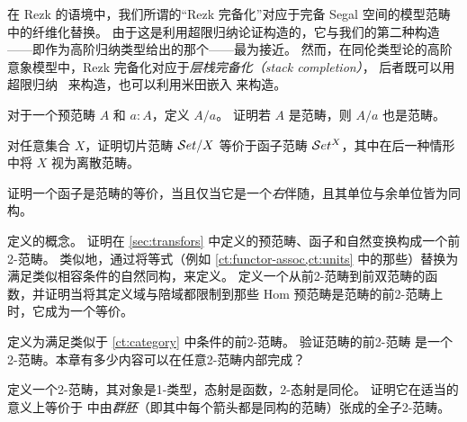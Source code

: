 在 Rezk 的语境中，我们所谓的``Rezk 完备化''对应于完备 Segal 空间的模型范畴中的纤维化替换。
由于这是利用超限归纳论证构造的，它与我们的第二种构造——即作为高阶归纳类型给出的那个——最为接近。
然而，在同伦类型论的高阶意象模型中，Rezk 完备化对应于\emph{层栈完备化（stack completion）}，
后者既可以用超限归纳~\cite{jt:strong-stacks} 来构造，也可以利用米田嵌入 \cite{bunge:stacks-morita-internal} 来构造。

\sectionExercises

\begin{ex}\label{ex:slice-precategory}
  对于一个预范畴 $A$ 和 $a:A$，定义 $A/a$。
  证明若 $A$ 是范畴，则 $A/a$ 也是范畴。
\end{ex}

\begin{ex}\label{ex:set-slice-over-equiv-functor-category}
  对任意集合 $X$，证明切片范畴 $\mathcal{S}et/X$ 等价于函子范畴 $\mathcal{S}et^X$，其中在后一种情形中将 $X$ 视为离散范畴。
\end{ex}

\begin{ex}\label{ex:functor-equiv-right-adjoint}
  证明一个函子是范畴的等价，当且仅当它是一个\emph{右}伴随，且其单位与余单位皆为同构。
\end{ex}

\begin{ex}\label{ct:pre2cat}
  定义的概念。
  证明在 \cref{sec:transfors} 中定义的预范畴、函子和自然变换构成一个前2-范畴。
  类似地，通过将等式（例如 \cref{ct:functor-assoc,ct:units} 中的那些）替换为满足类似相容条件的自然同构，来定义。
  定义一个从前2-范畴到前双范畴的函数，并证明当将其定义域与陪域都限制到那些 Hom 预范畴是范畴的前2-范畴上时，它成为一个等价。
\end{ex}

\begin{ex}\label{ct:2cat}
  定义为满足类似于 \cref{ct:category} 中条件的前2-范畴。
  验证范畴的前2-范畴 \ucat 是一个2-范畴。本章有多少内容可以在任意2-范畴内部完成？
\end{ex}

\begin{ex}\label{ct:groupoids}
  定义一个2-范畴，其对象是1-类型，态射是函数，2-态射是同伦。
  证明它在适当的意义上等价于 \ucat 中由\emph{群胚}（即其中每个箭头都是同构的范畴）张成的全子2-范畴。
\end{ex}

